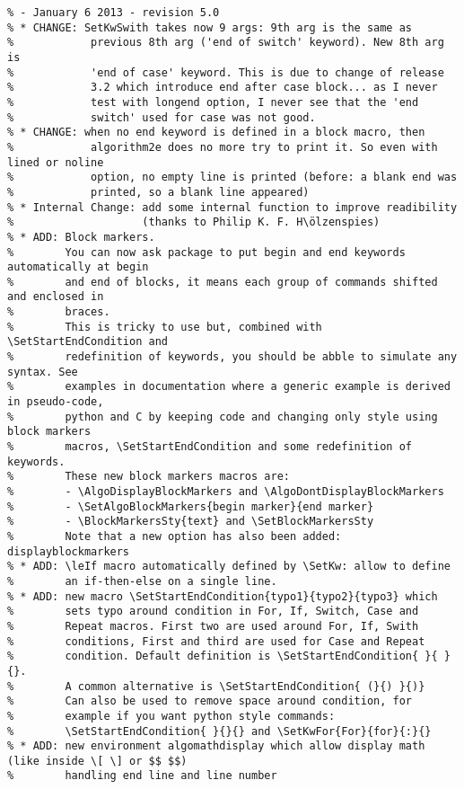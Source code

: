 \documentclass[a4paper]{article}
\begin{document}
\begin{verbatim}
% - January 6 2013 - revision 5.0
% * CHANGE: SetKwSwith takes now 9 args: 9th arg is the same as
%            previous 8th arg ('end of switch' keyword). New 8th arg is
%            'end of case' keyword. This is due to change of release
%            3.2 which introduce end after case block... as I never
%            test with longend option, I never see that the 'end
%            switch' used for case was not good.
% * CHANGE: when no end keyword is defined in a block macro, then
%            algorithm2e does no more try to print it. So even with lined or noline
%            option, no empty line is printed (before: a blank end was
%            printed, so a blank line appeared)
% * Internal Change: add some internal function to improve readibility
%                    (thanks to Philip K. F. H\ölzenspies)
% * ADD: Block markers. 
%        You can now ask package to put begin and end keywords automatically at begin
%        and end of blocks, it means each group of commands shifted and enclosed in
%        braces.
%        This is tricky to use but, combined with \SetStartEndCondition and
%        redefinition of keywords, you should be abble to simulate any syntax. See
%        examples in documentation where a generic example is derived in pseudo-code,
%        python and C by keeping code and changing only style using block markers
%        macros, \SetStartEndCondition and some redefinition of keywords.
%        These new block markers macros are:
%        - \AlgoDisplayBlockMarkers and \AlgoDontDisplayBlockMarkers
%        - \SetAlgoBlockMarkers{begin marker}{end marker}
%        - \BlockMarkersSty{text} and \SetBlockMarkersSty
%        Note that a new option has also been added: displayblockmarkers
% * ADD: \leIf macro automatically defined by \SetKw: allow to define
%        an if-then-else on a single line.
% * ADD: new macro \SetStartEndCondition{typo1}{typo2}{typo3} which
%        sets typo around condition in For, If, Switch, Case and
%        Repeat macros. First two are used around For, If, Swith
%        conditions, First and third are used for Case and Repeat
%        condition. Default definition is \SetStartEndCondition{ }{ }{}.
%        A common alternative is \SetStartEndCondition{ (}{) }{)}
%        Can also be used to remove space around condition, for
%        example if you want python style commands:
%        \SetStartEndCondition{ }{}{} and \SetKwFor{For}{for}{:}{}
% * ADD: new environment algomathdisplay which allow display math (like inside \[ \] or $$ $$) 
%        handling end line and line number

\end{verbatim}
\end{document}
